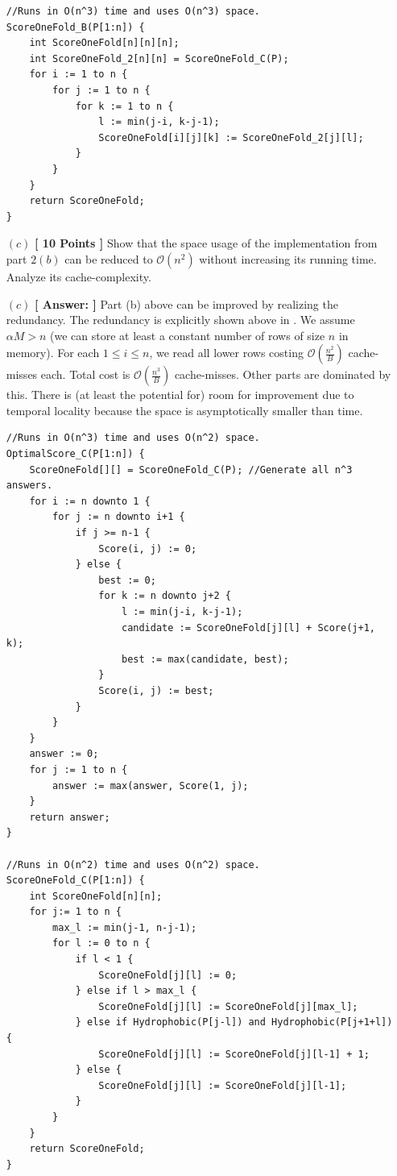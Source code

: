 \documentclass[11pt]{article}
\newcommand{\Oh}[1]{{\mathcal O}\left({#1}\right)}
\def\func#1{\mbox{\textrm{\bf{\sc{#1}}}}}
\begin{document}
\begin{itemize}
\begin{verbatim}
//Runs in O(n^3) time and uses O(n^3) space.
ScoreOneFold_B(P[1:n]) {
    int ScoreOneFold[n][n][n];
    int ScoreOneFold_2[n][n] = ScoreOneFold_C(P);
    for i := 1 to n {
        for j := 1 to n {
            for k := 1 to n {
                l := min(j-i, k-j-1);
                ScoreOneFold[i][j][k] := ScoreOneFold_2[j][l];
            }
        }
    }
    return ScoreOneFold;
}
        \end{verbatim}

    \item[$(c)$] {\bf{[ 10 Points ]}} Show that the space usage of the implementation from 
        part $2(b)$ can be reduced to $\Oh{n^2}$ without increasing its running time.
        Analyze its cache-complexity.

    \item[$(c)$] {\bf{[ Answer: ]}}
        Part (b) above can be improved by realizing the redundancy.  The redundancy is explicitly shown above in \func{ScoreOneFold\_B}.
        We assume $\alpha M>n$ (we can store at least a constant number of rows of size $n$ in memory).
        For each $1\leq i\leq n$, we read all lower rows costing $\Oh{\frac{n^2}{B}}$ cache-misses each.  Total cost is $\Oh{\frac{n^3}{B}}$ cache-misses.  Other parts are dominated by this. There is (at least the potential for) room for improvement due to temporal locality because the space is asymptotically smaller than time.

        \begin{verbatim}
//Runs in O(n^3) time and uses O(n^2) space.
OptimalScore_C(P[1:n]) {
    ScoreOneFold[][] = ScoreOneFold_C(P); //Generate all n^3 answers.
    for i := n downto 1 {
        for j := n downto i+1 {
            if j >= n-1 {
                Score(i, j) := 0;
            } else {
                best := 0;
                for k := n downto j+2 {
                    l := min(j-i, k-j-1);
                    candidate := ScoreOneFold[j][l] + Score(j+1, k);
                    best := max(candidate, best);
                }
                Score(i, j) := best;
            }
        }
    }
    answer := 0;
    for j := 1 to n {
        answer := max(answer, Score(1, j);
    }
    return answer;
}

//Runs in O(n^2) time and uses O(n^2) space.
ScoreOneFold_C(P[1:n]) {
    int ScoreOneFold[n][n];
    for j:= 1 to n {
        max_l := min(j-1, n-j-1);
        for l := 0 to n {
            if l < 1 {
                ScoreOneFold[j][l] := 0;
            } else if l > max_l {
                ScoreOneFold[j][l] := ScoreOneFold[j][max_l];
            } else if Hydrophobic(P[j-l]) and Hydrophobic(P[j+1+l]) {
                ScoreOneFold[j][l] := ScoreOneFold[j][l-1] + 1;
            } else {
                ScoreOneFold[j][l] := ScoreOneFold[j][l-1];
            }
        }
    }
    return ScoreOneFold;
}
        \end{verbatim}


\end{itemize}
\end{document}
